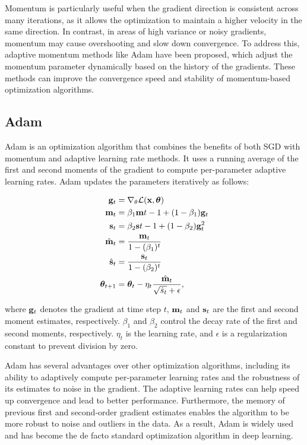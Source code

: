 Momentum is particularly useful when the gradient direction is consistent across many iterations, as it allows the optimization to maintain a higher velocity in the same direction.
In contrast, in areas of high variance or noisy gradients, momentum may cause overshooting and slow down convergence.
To address this, adaptive momentum methods like Adam have been proposed, which adjust the momentum parameter dynamically based on the history of the gradients.
These methods can improve the convergence speed and stability of momentum-based optimization algorithms.


\subsection{Adam}
Adam is an optimization algorithm that combines the benefits of both SGD with momentum and adaptive learning rate methods.
It uses a running average of the first and second moments of the gradient to compute per-parameter adaptive learning rates.
Adam updates the parameters iteratively as follows:

\begin{align}
\bold{g}_t &= \nabla_\theta \mathcal{L}(\bold{x}, \boldsymbol{\theta}) \\
\bold{m}_t &= \beta_1 \bold{m}{t-1} + (1-\beta_1) \bold{g}_t \\
\bold{s}_t &= \beta_2 \bold{s}{t-1} + (1-\beta_2) \bold{g}_t^2\\
\hat{\bold{m}}_t &= \frac{\bold{m}_t}{1 - (\beta_1)^t} \\
\hat{\bold{s}}_t &= \frac{\bold{s}_t}{1 - (\beta_2)^t} \\
\boldsymbol{\theta}_{t+1} &= \boldsymbol{\theta}_t - \eta_t \frac{\hat{\bold{m}}_t}{\sqrt{\hat{s}_t} + \epsilon},
\end{align}

where $\bold{g}_t$ denotes the gradient at time step $t$, $\bold{m}_t$ and $\bold{s}_t$ are the first and second moment estimates, respectively.
$\beta_1$ and $\beta_2$ control the decay rate of the first and second moments, respectively.
$\eta_t$ is the learning rate, and $\epsilon$ is a regularization constant to prevent division by zero.

Adam has several advantages over other optimization algorithms, including its ability to adaptively compute per-parameter learning rates and the robustness of its estimates to noise in the gradient.
The adaptive learning rates can help speed up convergence and lead to better performance.
Furthermore, the memory of previous first and second-order gradient estimates enables the algorithm to be more robust to noise and outliers in the data.
As a result, Adam is widely used and has become the de facto standard optimization algorithm in deep learning.


